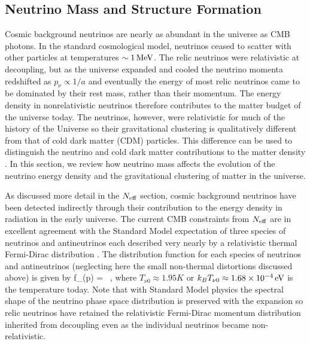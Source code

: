 \subsection{Neutrino Mass and Structure Formation}
\label{ssec:numasstheoryreview}
Cosmic background neutrinos are nearly as abundant in the universe as CMB photons. In the standard cosmological model, neutrinos ceased to scatter with other particles at temperatures $\sim 1 \, {\rm MeV}$. The relic neutrinos were relativistic at decoupling, but as the universe expanded and cooled the neutrino momenta redshifted as $p_\nu\propto 1/a$ and eventually the energy of most relic neutrinos came to be dominated by their rest mass, rather than their momentum. The energy density in nonrelativistic neutrinos therefore contributes to the matter budget of the universe today. The neutrinos, however, were relativistic for much of the history of the Universe so their gravitational clustering is qualitatively different from that of cold dark matter (CDM) particles. This difference can be used to distinguish the neutrino and cold dark matter contributions to the matter density \cite{Hu:1997mj, Lesgourgues:2006nd, Abazajian:2011dt}.  In this section, we review how neutrino mass affects the evolution of the neutrino energy density and the gravitational clustering of matter in the universe. 
 
As discussed more detail in the $N_{\rm eff}$ section, cosmic background neutrinos have been detected indirectly through their contribution to the energy density in radiation in the early universe. The current CMB constraints from $N_{\rm eff}$ are in excellent agreement with the Standard Model expectation of three species of neutrinos and antineutrinos each described very nearly by a relativistic thermal Fermi-Dirac distribution \cite{Ade:2015xua}. The distribution function for each species of neutrinos and antineutrinos (neglecting here the small non-thermal distortions discussed above) is given by
\beq
f_\nu(p) =  \ ,
\eeq
where $T_{\nu 0} \approx 1.95K$ or $k_B T_{\nu 0} \approx 1.68 \times 10^{-4}\,{\rm eV}$ is the temperature today. Note that with Standard Model physics the spectral shape of the neutrino phase space distribution is preserved with the expansion so relic neutrinos have retained the relativistic Fermi-Dirac momentum distribution inherited from decoupling even as the individual neutrinos became non-relativistic. 

